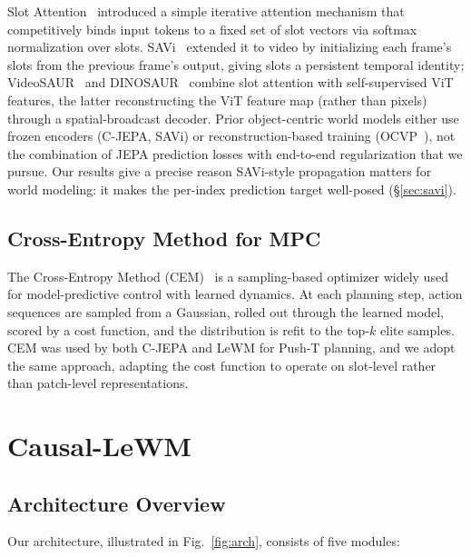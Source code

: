 \documentclass[12pt]{article}
\begin{document}
Slot Attention~\citep{locatello2020slot} introduced a simple iterative attention mechanism that competitively binds input tokens to a fixed set of slot vectors via softmax normalization over slots. SAVi~\citep{kipf2021savi} extended it to video by initializing each frame's slots from the previous frame's output, giving slots a persistent temporal identity; VideoSAUR~\citep{wu2023videosaur} and DINOSAUR~\citep{seitzer2023dinosaur} combine slot attention with self-supervised ViT features, the latter reconstructing the ViT feature map (rather than pixels) through a spatial-broadcast decoder. Prior object-centric world models either use frozen encoders (C-JEPA, SAVi) or reconstruction-based training (OCVP~\citep{villarcorrales2022ocvp}), not the combination of JEPA prediction losses with end-to-end regularization that we pursue. Our results give a precise reason SAVi-style propagation matters for world modeling: it makes the per-index prediction target well-posed (\S\ref{sec:savi}).

\subsection{Cross-Entropy Method for MPC}

The Cross-Entropy Method (CEM)~\citep{rubinstein2004cem} is a sampling-based optimizer widely used for model-predictive control with learned dynamics. At each planning step, action sequences are sampled from a Gaussian, rolled out through the learned model, scored by a cost function, and the distribution is refit to the top-$k$ elite samples. CEM was used by both C-JEPA and LeWM for Push-T planning, and we adopt the same approach, adapting the cost function to operate on slot-level rather than patch-level representations.

\section{Causal-LeWM}

\subsection{Architecture Overview}

Our architecture, illustrated in Fig.~\ref{fig:arch}, consists of five modules:
\end{document}
